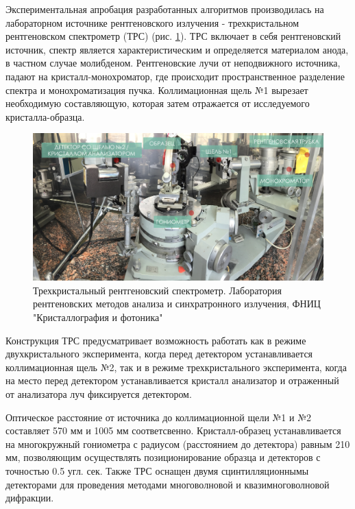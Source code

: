 Экспериментальная апробация разработанных алгоритмов производилась на лабораторном источнике
рентгеновского излучения - трехкристальном рентгеновском спектрометр (ТРС) (рис. \ref{ris:trs}).
ТРС включает в себя рентгеновский источник, спектр является характеристическим и
определяется материалом анода, в частном случае молибденом. Рентгеновские
лучи от неподвижного источника, падают на кристалл-монохроматор, где происходит
пространственное разделение спектра и монохроматизация пучка. Коллимационная щель №1
вырезает необходимую составляющую, которая затем отражается от исследуемого кристалла-образца.

\begin{figure}[H]
  \centering
  \includegraphics[width=1\textwidth]{images/trs.png}
  \caption{ Трехкристальный рентгеновский спектрометр. Лаборатория рентгеновских
  методов анализа и синхратронного излучения, ФНИЦ "Кристаллография и фотоника"}
  \label{ris:trs}
\end{figure}

Конструкция ТРС предусматривает возможность работать как в режиме двухкристального эксперимента,
когда перед детектором устанавливается коллимационная щель №2,
так и в режиме трехкристального эксперимента, когда на место
 перед детектором устанавливается кристалл анализатор и отраженный от анализатора луч
фиксируется детектором.

Оптическое расстояние от источника до коллимационной щели №1 и №2 составляет 570 мм
и 1005 мм соответсвенно. Кристалл-образец устанавливается на многокружный гониометра с радиусом
(расстоянием до детектора) равным 210 мм, позволяющим осуществлять позиционирование образца и детекторов
 с точностью 0.5 угл. сек. Также ТРС оснащен двумя сцинтилляционнымы детекторами для
проведения методами многоволновой и квазимноговолновой дифракции.
